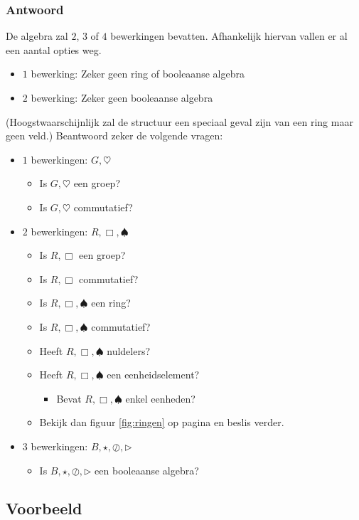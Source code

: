 \documentclass[main.tex]{subfiles}
\begin{document}
\subsubsection{Antwoord}
De algebra zal $2$, $3$ of $4$ bewerkingen bevatten.
Afhankelijk hiervan vallen er al een aantal opties weg.
\begin{itemize}
\item $1$ bewerking: Zeker geen ring of booleaanse algebra
\item $2$ bewerking: Zeker geen booleaanse algebra
\end{itemize}
(Hoogstwaarschijnlijk zal de structuur een speciaal geval zijn van een ring maar geen veld.)
Beantwoord zeker de volgende vragen:
\begin{itemize}
\item $1$ bewerkingen: $G,\heartsuit$
  \begin{itemize}
  \item Is $G,\heartsuit$ een groep?
  \item Is $G,\heartsuit$ commutatief?
  \end{itemize}
\item $2$ bewerkingen: $R, \Box, \spadesuit$
  \begin{itemize}
  \item Is $R, \Box$ een groep?
  \item Is $R, \Box$ commutatief?
  \item Is $R, \Box, \spadesuit$ een ring?
  \item Is $R, \Box, \spadesuit$ commutatief?
  \item Heeft $R, \Box, \spadesuit$ nuldelers?
  \item Heeft $R, \Box, \spadesuit$ een eenheidselement?
    \begin{itemize}
    \item Bevat $R, \Box, \spadesuit$ enkel eenheden?
    \end{itemize}
  \item Bekijk dan figuur \ref{fig:ringen} op pagina \pageref{fig:ringen} en beslis verder.
  \end{itemize}
\item $3$ bewerkingen: $B,\star,\oslash, \triangleright$
  \begin{itemize}
  \item Is $B,\star,\oslash, \triangleright$ een booleaanse algebra?
  \end{itemize}
\end{itemize}

\subsection{Voorbeeld}
\end{document}

